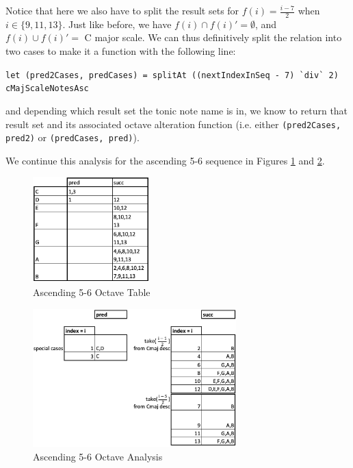 \documentclass{report}
\begin{document}
Notice that here we also have to split the result sets for $f(i) = \frac{i-7}{2}$ when $i \in \{9,11,13\}$. Just like before, we have $f(i) \cap f(i)' = \emptyset$, and $f(i) \cup f(i)' =$ C major scale. We can thus definitively split  the relation into two cases to make it a function with the following line:

\verb.let (pred2Cases, predCases) = splitAt ((nextIndexInSeq - 7) `div` 2) cMajScaleNotesAsc.

and depending which result set the tonic note name is in, we know to return that result set and its associated octave alteration function (i.e. either \verb.(pred2Cases, pred2). or \verb.(predCases, pred).).

We continue this analysis for the ascending 5-6 sequence in Figures \ref{fig:asc_56_octave_grid} and \ref{fig:asc_56_octave_analysis}.

\begin{figure}[h!]
\centering
\includegraphics[width=0.4\textwidth]{images/asc56_octave_grid}
  \caption{Ascending 5-6 Octave Table}
  \label{fig:asc_56_octave_grid}
\end{figure}

\begin{figure}[h!]
\centering
\includegraphics[width=0.7\textwidth]{images/asc56_octave_analysis}
  \caption{Ascending 5-6 Octave Analysis}
  \label{fig:asc_56_octave_analysis}
\end{figure}
\newpage
\end{document}
